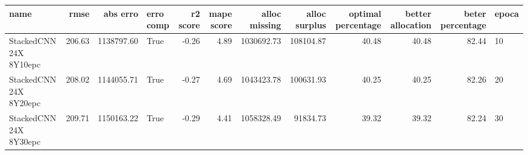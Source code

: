 \begin{tabular}{lrrlrrrrrrrl}
\toprule
name & rmse & abs erro & erro comp & r2 score & mape score & alloc missing & alloc surplus & optimal percentage & better allocation & beter percentage & epoca \\
\midrule
StackedCNN 24X 8Y10epc & 206.63 & 1138797.60 & True & -0.26 & 4.89 & 1030692.73 & 108104.87 & 40.48 & 40.48 & 82.44 & 10 \\
StackedCNN 24X 8Y20epc & 208.02 & 1144055.71 & True & -0.27 & 4.69 & 1043423.78 & 100631.93 & 40.25 & 40.25 & 82.26 & 20 \\
StackedCNN 24X 8Y30epc & 209.71 & 1150163.22 & True & -0.29 & 4.41 & 1058328.49 & 91834.73 & 39.32 & 39.32 & 82.24 & 30 \\
\bottomrule
\end{tabular}
